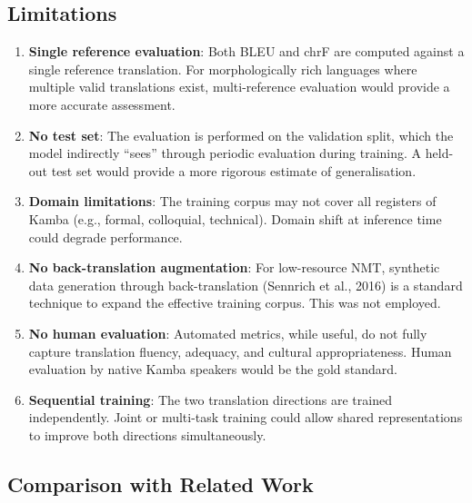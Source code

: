 \documentclass[12pt,a4paper]{article}
\begin{document}
\subsection{Limitations}

\begin{enumerate}
    \item \textbf{Single reference evaluation}: Both BLEU and chrF are computed against a single reference translation. For morphologically rich languages where multiple valid translations exist, multi-reference evaluation would provide a more accurate assessment.
    
    \item \textbf{No test set}: The evaluation is performed on the validation split, which the model indirectly ``sees'' through periodic evaluation during training. A held-out test set would provide a more rigorous estimate of generalisation.
    
    \item \textbf{Domain limitations}: The training corpus may not cover all registers of Kamba (e.g., formal, colloquial, technical). Domain shift at inference time could degrade performance.
    
    \item \textbf{No back-translation augmentation}: For low-resource NMT, synthetic data generation through back-translation (Sennrich et al., 2016) is a standard technique to expand the effective training corpus. This was not employed.
    
    \item \textbf{No human evaluation}: Automated metrics, while useful, do not fully capture translation fluency, adequacy, and cultural appropriateness. Human evaluation by native Kamba speakers would be the gold standard.
    
    \item \textbf{Sequential training}: The two translation directions are trained independently. Joint or multi-task training could allow shared representations to improve both directions simultaneously.
\end{enumerate}

\subsection{Comparison with Related Work}
\end{document}
